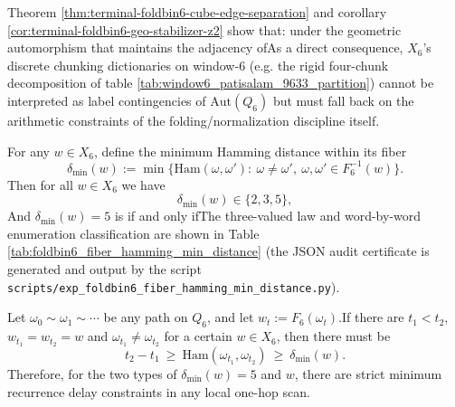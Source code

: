 \begin{enumerate}
\begin{remark}\label{rem:terminal-foldbin6-geo-vs-gauge}Theorem \ref{thm:terminal-foldbin6-cube-edge-separation} and corollary \ref{cor:terminal-foldbin6-geo-stabilizer-z2} show that: under the geometric automorphism that maintains the adjacency ofAs a direct consequence, \(X_6\)'s discrete chunking dictionaries on window-\(6\) (e.g. the rigid four-chunk decomposition of table \ref{tab:window6_patisalam_9633_partition}) cannot be interpreted as label contingencies of \(\mathrm{Aut}(Q_6)\) but must fall back on the arithmetic constraints of the folding/normalization discipline itself.  \end{remark}

\begin{theorem}\label{thm:terminal-foldbin6-fiber-hamming-three-valued}For any \(w\in X_6\), define the minimum Hamming distance within its fiber  \[
  \delta_{\min}(w):=\min\bigl\{\mathrm{Ham}(\omega,\omega'):\ \omega\neq \omega',\ \omega,\omega'\in F_6^{-1}(w)\bigr\}.
  \]
Then for all \(w\in X_6\) we have  \[
  \delta_{\min}(w)\in\{2,3,5\},
  \]
And \(\delta_{\min}(w)=5\) is if and only ifThe three-valued law and word-by-word enumeration classification are shown in Table \ref{tab:foldbin6_fiber_hamming_min_distance} (the JSON audit certificate is generated and output by the script \texttt{scripts/exp\_foldbin6\_fiber\_hamming\_min\_distance.py}).  \end{theorem}
  

\begin{corollary}\label{cor:terminal-foldbin6-min-return-delay}Let \(\omega_0\sim\omega_1\sim\cdots\) be any path on \(Q_6\), and let \(w_t:=F_6(\omega_t)\).If there are \(t_1<t_2\), \(w_{t_1}=w_{t_2}=w\) and \(\omega_{t_1}\neq \omega_{t_2}\) for a certain \(w\in X_6\), then there must be  \[
  t_2-t_1\ \ge\ \mathrm{Ham}(\omega_{t_1},\omega_{t_2})\ \ge\ \delta_{\min}(w).
  \]
Therefore, for the two types of \(\delta_{\min}(w)=5\) and \(w\), there are strict minimum recurrence delay constraints in any local one-hop scan.  \end{corollary}


\end{enumerate}
